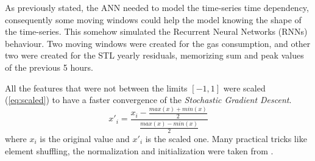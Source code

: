 \documentclass{sig-alternate-sigmod07}
\begin{document}
As previously stated, the ANN needed to model the time-series time dependency, consequently some moving windows could help the model knowing the shape of the time-series. This somehow simulated the Recurrent Neural Networks (RNNs) behaviour. Two moving windows were created for the gas consumption, and other two were created for the STL yearly residuals, memorizing sum and peak values of the previous 5 hours.

All the features that were not between the limits $[-1,1]$ were scaled (\cref{eq:scaled}) to have a faster convergence \cite{lecun2012efficient} of the \emph{Stochastic Gradient Descent}.
\begin{equation}\label{eq:scaled}
x'_i=\frac{x_i -  \frac{max(x) + min(x)}{2}}{ \frac{max(x) - min(x)}{2}}\end{equation} where $x_i$ is the original value and $x'_i$ is the scaled one. Many practical tricks like element shuffling, the normalization and initialization were taken from \cite{lecun2012efficient, bottou2012stochastic}.
\end{document}
